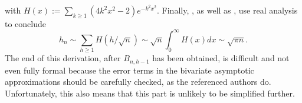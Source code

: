 with \(H(x) := \sum_{k \geqslant 1}(4k^2x^2-2)e^{-k^2x^2}\). Finally,
\citet*[5.9]{SedgewickFlajolet_1996}, as well as
\citet*[9.6]{GrahamKnuthPatashnik_1994}, use real analysis to conclude
\begin{equation*}
h_{n} \sim \sum_{h \geqslant 1}H(h/\!\sqrt{n})
\sim \sqrt{n} \int_0^{\infty}\!\!H(x) dx \sim \sqrt{\pi n}.
\end{equation*}
The end of this derivation, after \(B_{n,h-1}\) has been obtained, is
difficult and not even fully formal because the error terms in the
bivariate asymptotic approximations should be carefully checked, as
the referenced authors do. Unfortunately, this also means that this
part is unlikely to be simplified further.
